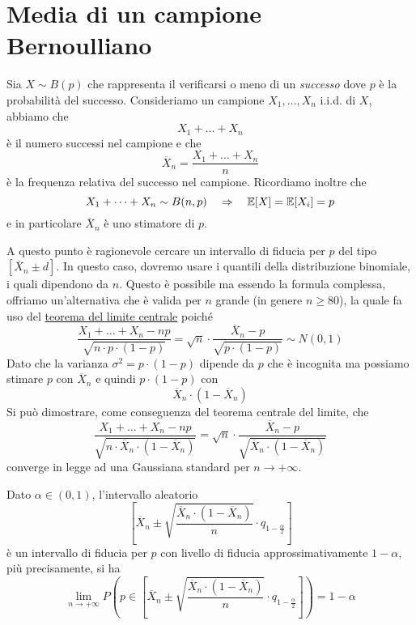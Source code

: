 \section{Media di un campione Bernoulliano}
Sia $X \sim B(p)$ che rappresenta il verificarsi o meno di un \emph{successo} dove $p$ è la
probabilità del successo. Consideriamo un campione $X_1, \dots, X_n$ i.i.d. di $X$, abbiamo che
\[ X_1 + \dots + X_n \]
è il numero successi nel campione e che
\[ \overline{X}_n = \frac{X_1 + \dots + X_n}{n} \]
è la frequenza relativa del successo nel campione. Ricordiamo inoltre che
\[ X_1 + \dots + X_n \sim B(n,p) \quad \Rightarrow \quad \mathbb{E}[X] = \mathbb{E}[X_i] = p \]
e in particolare $\overline{X}_n$ è uno stimatore di $p$.

A questo punto è ragionevole cercare un intervallo di fiducia per $p$ del tipo
$[\overline{X}_n \pm d]$. In questo caso, dovremo usare i quantili della distribuzione binomiale,
i quali dipendono da $n$. Questo è possibile ma essendo la formula complessa, offriamo
un'alternativa che è valida per $n$ grande (in genere $n \geq 80$), la quale fa uso del
\hyperref[th: tlc]{teorema del limite centrale} poiché
\[
	\frac{X_1 + \dots + X_n - np}{\sqrt{n \cdot p \cdot (1-p)}} =
	\sqrt{n} \cdot \frac{\overline{X}_n - p}{\sqrt{p \cdot (1-p)}} \sim N(0,1)
\]
Dato che la varianza $\sigma^2 = p \cdot (1-p)$ dipende da $p$ che è incognita ma possiamo stimare
$p$ con $\overline{X}_n$ e quindi $p \cdot (1-p)$ con
\[ \overline{X}_n \cdot (1 - \overline{X}_n) \]
Si può dimostrare, come conseguenza del teorema centrale del limite, che
\[
	\frac{X_1 + \dots + X_n - np}{\sqrt{n \cdot \overline{X}_n \cdot (1 - \overline{X}_n)}} =
	\sqrt{n} \cdot \frac{\overline{X}_n - p}{\sqrt{\overline{X}_n \cdot (1 - \overline{X}_n)}}
\]
converge in legge ad una Gaussiana standard per $n \to +\infty$.

\begin{proposition}
	Dato $\alpha \in (0,1)$, l'intervallo aleatorio
	\[
		\left[
			\overline{X}_n \pm \sqrt{\frac{\overline{X}_n \cdot (1 - \overline{X}_n)}{n}}
			\cdot q_{1 - \frac{\alpha}{2}}
			\right]
	\]
	è un intervallo di fiducia per $p$ con livello di fiducia approssimativamente $1-\alpha$, più
	precisamente, si ha
	\[
		\lim_{n \to +\infty} P \left( p \in \left[ \overline{X}_n \pm
			\sqrt{\frac{\overline{X}_n \cdot (1 - \overline{X}_n)}{n}} \cdot
			q_{1 - \frac{\alpha}{2}} \right] \right) = 1 - \alpha
	\]
\end{proposition}

